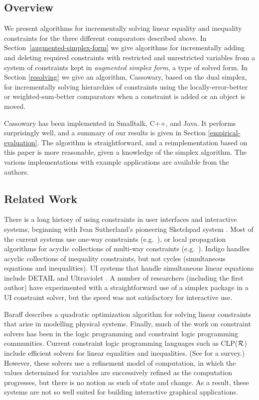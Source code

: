\documentclass{article}
\begin{document}
\subsection{Overview}

We present algorithms for incrementally solving linear equality and
inequality constraints for the three different comparators described
above. In Section~\ref{augmented-simplex-form} we give algorithms for
incrementally adding and deleting required constraints with restricted and
unrestricted variables from a system of constraints kept in {\em augmented
simplex form}, a type of solved form.  In Section \ref{resolving} we give
an algorithm, Cassowary, based on the dual simplex, for incrementally
solving hierarchies of constraints using the locally-error-better or
weighted-sum-better comparators when a constraint is added or an object is
moved.

Cassowary has been implemented in Smalltalk, C++, and Java. It performs
surprisingly well, and a summary of our results is given in Section
\ref{empirical-evaluation}.  The algorithm is straightforward, and a
reimplementation based on this paper is more reasonable, given a
knowledge of the simplex algorithm.  The various implementations with
example applications are available from the authors.

\subsection{Related Work}

There is a long history of using constraints in user interfaces and
interactive systems, beginning with Ivan Sutherland's pioneering Sketchpad
system \cite{sutherland-ifips-63}.  Most of the current systems use one-way
constraints (e.g.\ \cite{hudson-subarctic-manual,myers-chi-96}), or local
propagation algorithms for acyclic collections of multi-way constraints
(e.g.\ \cite{sannella-spe-93,vander-zanden-toplas-96}).
Indigo \cite{borning-uist-96} handles acyclic collections of inequality
constraints, but not cycles (simultaneous equations and inequalities).  UI
systems that handle simultaneous linear equations include \mbox{DETAIL}
\cite{hosobe-cp-96} and Ultraviolet \cite{borning-cp-95}.  A number of
researchers (including the first author) have experimented with a
straightforward use of a simplex package in a UI constraint solver,
but the speed was not satisfactory for interactive use.

Baraff \cite{baraff-siggraph-94} describes a quadratic optimization
algorithm for solving linear constraints that arise in modelling physical
systems.  Finally, much of the work on constraint solvers
has been in the logic programming and constraint logic programming
communities.  Current constraint logic programming languages such as
CLP($\cal R$) \cite{jaffar-toplas-92} include efficient solvers for linear
equalities and inequalities.  (See \cite{marriott-stuckey-book} for a
survey.)  However, these solvers use a refinement model of computation, in
which the values determined for variables are successively refined as the
computation progresses, but there is no notion as such of state and change.
As a result, these systems are not so well suited for building interactive
graphical applications.
\end{document}
